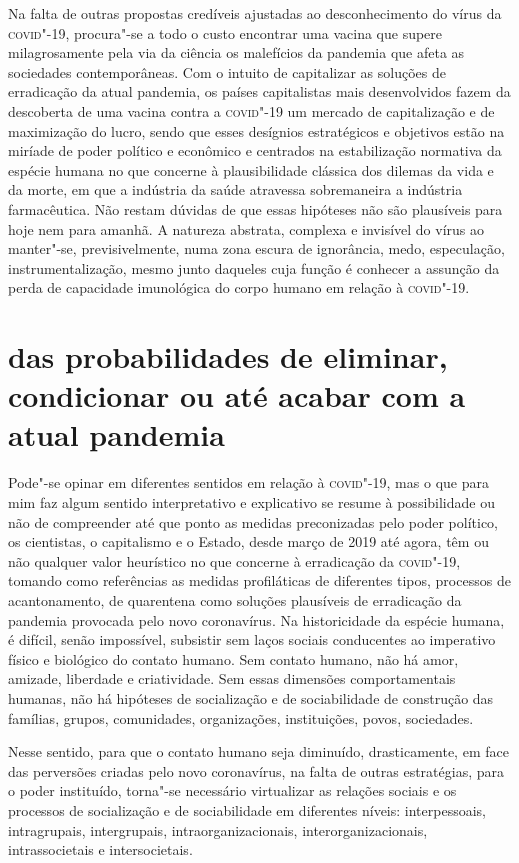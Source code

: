 Na falta de outras propostas credíveis ajustadas ao desconhecimento do
vírus da \textsc{covid}"-19, procura"-se a todo o custo encontrar uma vacina que
supere milagrosamente pela via da ciência os malefícios da pandemia que
afeta as sociedades contemporâneas. Com o intuito de capitalizar as
soluções de erradicação da atual pandemia, os países capitalistas mais
desenvolvidos fazem da descoberta de uma vacina contra a \textsc{covid}"-19 um
mercado de capitalização e de maximização do lucro, sendo que esses
desígnios estratégicos e objetivos estão na miríade de poder político e
econômico e centrados na estabilização normativa da espécie humana no
que concerne à plausibilidade clássica dos dilemas da vida e da morte,
em que a indústria da saúde atravessa sobremaneira a indústria
farmacêutica. Não restam dúvidas de que essas hipóteses não são
plausíveis para hoje nem para amanhã. A natureza abstrata, complexa e
invisível do vírus ao manter"-se, previsivelmente, numa zona escura de
ignorância, medo, especulação, instrumentalização, mesmo junto daqueles
cuja função é conhecer a assunção da perda de capacidade imunológica do
corpo humano em relação à \textsc{covid}"-19.

\section{das probabilidades de eliminar, condicionar ou até acabar com a
atual pandemia}

Pode"-se opinar em diferentes sentidos em relação à \textsc{covid}"-19, mas o que
para mim faz algum sentido interpretativo e explicativo se resume à
possibilidade ou não de compreender até que ponto as medidas
preconizadas pelo poder político, os cientistas, o capitalismo e o
Estado, desde março de 2019 até agora, têm ou não qualquer valor
heurístico no que concerne à erradicação da \textsc{covid}"-19, tomando como
referências as medidas profiláticas de diferentes tipos, processos de
acantonamento, de quarentena como soluções plausíveis de erradicação da
pandemia provocada pelo novo coronavírus. Na historicidade da espécie
humana, é difícil, senão impossível, subsistir sem laços sociais
conducentes ao imperativo físico e biológico do contato humano. Sem
contato humano, não há amor, amizade, liberdade e criatividade. Sem
essas dimensões comportamentais humanas, não há hipóteses de
socialização e de sociabilidade de construção das famílias, grupos,
comunidades, organizações, instituições, povos, sociedades.

Nesse sentido, para que o contato humano seja diminuído, drasticamente,
em face das perversões criadas pelo novo coronavírus, na falta de outras
estratégias, para o poder instituído, torna"-se necessário virtualizar as
relações sociais e os processos de socialização e de sociabilidade em
diferentes níveis: interpessoais, intragrupais, intergrupais,
intraorganizacionais, interorganizacionais, intrassocietais e
intersocietais.

